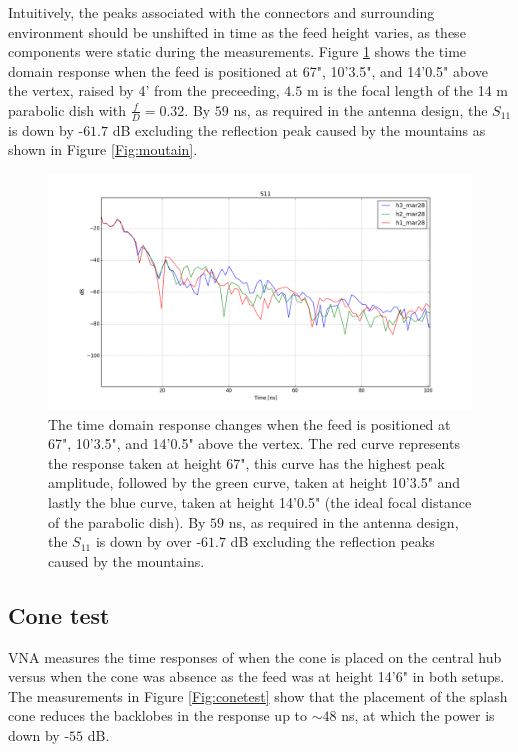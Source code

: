 \documentclass[preprint]{aastex}  %
\begin{document}
Intuitively, the peaks associated with the connectors and surrounding environment should be 
unshifted in time as the feed height varies, as these components were static during the 
measurements. Figure \ref{Fig:height_test} shows the time domain response when the feed is 
positioned at 67", 10'3.5", and 14'0.5" above the vertex, raised by 4' from the preceeding, 
$4.5$ m is the focal length of the 14 m parabolic dish with $\frac{f}{D} = 0.32$. By $59$ ns, as 
required in the antenna design, the $S_{11}$ is down by -$61.7$ dB excluding the reflection 
peak caused by the mountains as shown in Figure \ref{Fig:moutain}. 
\begin{figure}[H]
	\begin{center}
	\includegraphics[width =.7\textwidth]{reflectometry_plots/Mar28/mar28height-test}
	\caption{The time domain response changes when the feed is positioned at 67", 10'3.5", 
and 14'0.5" above the vertex. The red curve represents the response taken at height 67", this 
curve has the highest peak amplitude, followed by the green curve, taken at height 10'3.5" and 
lastly the blue curve, taken at height 14'0.5" (the ideal focal distance of the parabolic dish). By 
$59$ ns, as required in the antenna design, the $S_{11}$ is down by over -$61.7$ dB excluding 
the reflection peaks caused by the mountains.
\label{Fig:height_test} }
	\end{center}
\end{figure}
\clearpage

\subsection{Cone test}
VNA measures the time responses of when the cone is placed on the central hub 
versus when the cone was absence as the feed was at height 14'6" in both setups. The 
measurements in Figure \ref{Fig:conetest} show that the placement of the splash cone reduces 
the backlobes in the response up to $\sim48$ ns, at which the power is down by -$55$ dB.
\end{document}
